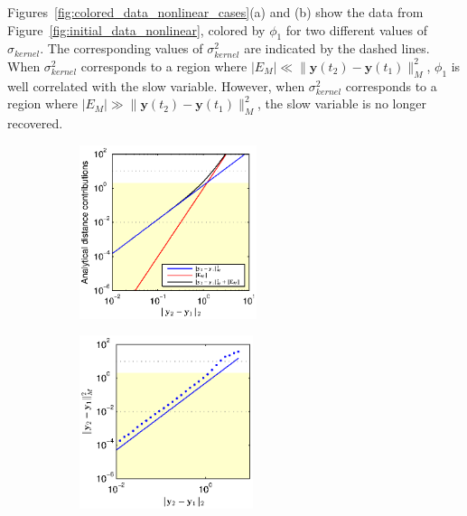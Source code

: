 Figures~\ref{fig:colored_data_nonlinear_cases}(a) and (b) show the data from Figure~\ref{fig:initial_data_nonlinear}, colored by $\phi_1$ for two different values of $\sigma_{kernel}$.
%
The corresponding values of $\sigma_{kernel}^2$ are indicated by the dashed lines.
%
When $\sigma_{kernel}^2$ corresponds to a region where $ |E_M | \ll \|\mathbf{y}(t_2) - \mathbf{y}(t_1) \|_M^2$, $\phi_1$ is well correlated with the slow variable.
%
However, when $\sigma_{kernel}^2$ corresponds to a region where $|E_M | \gg \|\mathbf{y}(t_2) - \mathbf{y}(t_1) \|_M^2$, the slow variable is no longer recovered.

\begin{figure}[t]
\centering
\begin{subfigure}{0.4\textwidth}
\centering
\includegraphics[height=2in]{dist_dy_analytical_nonlinear}
\caption{}
\end{subfigure}
%
\begin{subfigure}{0.4\textwidth}
\centering
\includegraphics[height=2in]{dist_dy_nonlinear}
\caption{}
\end{subfigure}


\end{figure}
